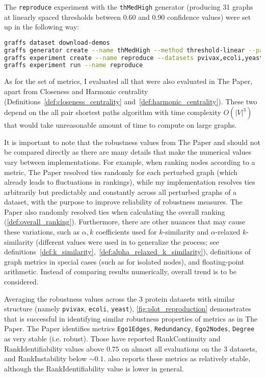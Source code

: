 The \texttt{reproduce} experiment with the \texttt{thMedHigh} generator (producing 31 graphs at linearly spaced thresholds between 0.60 and 0.90 confidence values) were set up in the following way:
\begin{lstlisting}[language=bash]
graffs dataset download-demos
graffs generator create --name thMedHigh --method threshold-linear --params 600,900 -n 31 --seed 7
graffs experiment create --name reproduce --datasets pvivax,ecoli,yeast --generator thMedHigh --metrics Betweenness,Degree,Ego1Edges,Ego2Nodes,LocalClustering,PageRank,Redundancy --robustnessMeasures RankIdentifiability,RankInstability,RankContinuity
graffs experiment run --name reproduce
\end{lstlisting}

As for the set of metrics, I evaluated all that were also evaluated in The Paper, apart from Closeness and Harmonic centrality (Definitions~\ref{def:closeness_centrality} and~\ref{def:harmonic_centrality}).
These two depend on the all pair shortest paths algorithm with time complexity $O({\left\lvert V \right\rvert}^3)$ that would take unreasonable amount of time to compute on large graphs.

\label{para:how_to_compare_results}
It is important to note that the robustness values from The Paper and \graffs should not be compared directly as there are many details that make the numerical values vary between implementations.
For example, when ranking nodes according to a metric, The Paper resolved ties randomly for each perturbed graph (which already leads to fluctuations in rankings), while my implementation resolves ties arbitrarily but predictably and constantly across all perturbed graphs of a dataset, with the purpose to improve reliability of robustness measures.
The Paper also randomly resolved ties when calculating the overall ranking (\autoref{def:overall_ranking}).
Furthermore, there are other nuances that may cause these variations, such as $\alpha,k$ coefficients used for $k$-similarity and $\alpha$-relaxed $k$-similarity (different values were used in \graffs to generalize the process; see definitions~\ref{def:k_similarity},~\ref{def:alpha_relaxed_k_similarity}), definitions of graph metrics in special cases (such as for isolated nodes), and floating-point arithmetic.
Instead of comparing results numerically, overall trend is to be considered.



Averaging the robustness values across the 3 protein datasets with similar structure (namely \texttt{pvivax}, \texttt{ecoli}, \texttt{yeast}), \autoref{fig:plot_reproduction} demonstrates that \graffs is successful in identifying similar robustness properties of metrics as in The Paper.
The Paper identifies metrics \texttt{Ego1Edges}, \texttt{Redundancy}, \texttt{Ego2Nodes}, \texttt{Degree} as very stable (i.e. robust).
Those have reported RankContinuity and RankIdentifiability values above $0.75$ on almost all evaluations on the 3 datasets, and RankInstability below $\sim 0.1$.
\graffs also reports these metrics as relatively stable, although the RankIdentifiability value is lower in general.

